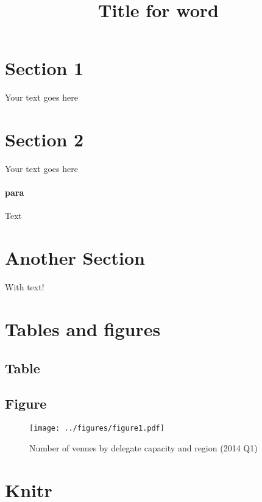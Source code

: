 \documentclass{mbie-word}\usepackage[]{graphicx}\usepackage[]{color}
\title{Title for word}
\begin{document}
\maketitle

\newpage
\ClearShipoutPicture

\tableofcontents

\section{Section 1}
Your text goes here

\section{Section 2}
Your text goes here

\cite{Hu.1997}

\paragraph{para}
Text

\section{Another Section}

With text!
\section{Tables and figures}

\subsection{Table}



\subsection{Figure}
\begin{figure}[H]
\caption{Number of venues by delegate capacity and region (2014 Q1)}
\label{fig:001} 
\centering 
  \texttt{[image: ../figures/figure1.pdf]}
\end{figure}

\section{Knitr}
\end{document}
